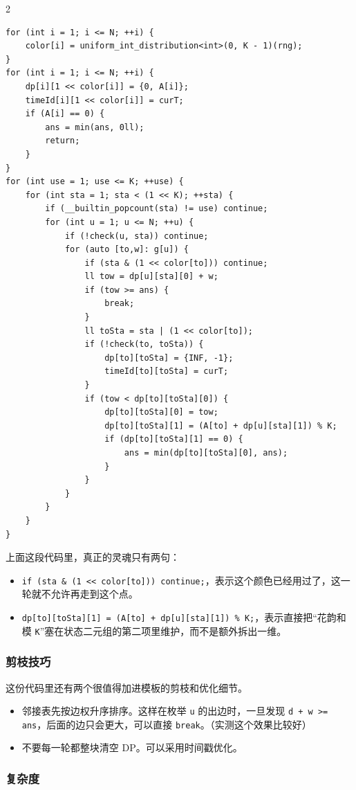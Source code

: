 \begin{multicols*}{2}
		\begin{verbatim}
for (int i = 1; i <= N; ++i) {
	color[i] = uniform_int_distribution<int>(0, K - 1)(rng);
}
for (int i = 1; i <= N; ++i) {
	dp[i][1 << color[i]] = {0, A[i]};
	timeId[i][1 << color[i]] = curT;
	if (A[i] == 0) {
		ans = min(ans, 0ll);
		return;
	}
}
for (int use = 1; use <= K; ++use) {
	for (int sta = 1; sta < (1 << K); ++sta) {
		if (__builtin_popcount(sta) != use) continue;
		for (int u = 1; u <= N; ++u) {
			if (!check(u, sta)) continue;
			for (auto [to,w]: g[u]) {
				if (sta & (1 << color[to])) continue;
				ll tow = dp[u][sta][0] + w;
				if (tow >= ans) {
					break;
				}
				ll toSta = sta | (1 << color[to]);
				if (!check(to, toSta)) {
					dp[to][toSta] = {INF, -1};
					timeId[to][toSta] = curT;
				}
				if (tow < dp[to][toSta][0]) {
					dp[to][toSta][0] = tow;
					dp[to][toSta][1] = (A[to] + dp[u][sta][1]) % K;
					if (dp[to][toSta][1] == 0) {
						ans = min(dp[to][toSta][0], ans);
					}
				}
			}
		}
	}
}
		\end{verbatim}

		上面这段代码里，真正的灵魂只有两句：

		\begin{itemize}
			\item \texttt{if (sta \& (1 << color[to])) continue;}，表示这个颜色已经用过了，这一轮就不允许再走到这个点。
			\item \texttt{dp[to][toSta][1] = (A[to] + dp[u][sta][1]) \% K;}，表示直接把“花韵和模 \texttt{K}”塞在状态二元组的第二项里维护，而不是额外拆出一维。
		\end{itemize}

		\subsubsection{剪枝技巧}

		这份代码里还有两个很值得加进模板的剪枝和优化细节。

		\begin{itemize}
			\item 邻接表先按边权升序排序。这样在枚举 \texttt{u} 的出边时，一旦发现 \texttt{d + w >= ans}，后面的边只会更大，可以直接 \texttt{break}。（实测这个效果比较好）
			\item 不要每一轮都整块清空 DP。可以采用时间戳优化。
		\end{itemize}

		\subsubsection{复杂度}


\end{multicols*}
